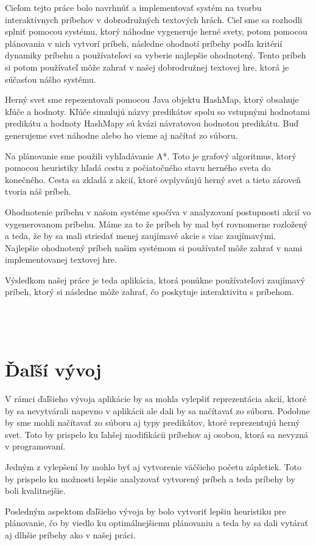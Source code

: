 Cieľom tejto práce bolo navrhnúť a implementovať systém na tvorbu interaktívnych príbehov v dobrodružných textových hrách. Cieľ sme sa rozhodli splniť pomocou systému, ktorý náhodne vygeneruje herné svety, potom pomocou plánovania v nich vytvorí príbeh, následne ohodnotí príbehy podľa kritérií dynamiky príbehu a používateľovi sa vyberie najlepšie ohodnotený. Tento príbeh si potom používateľ môže zahrať v našej dobrodružnej textovej hre, ktorá je súčasťou nášho systému.\par
Herný svet sme repezentovali pomocou Java objektu HashMap, ktorý obsahuje kľúče a hodnoty. Kľúče simulujú názvy predikátov spolu so vstupnými hodnotami predikátu a hodnoty HashMapy sú kvázi návratovou hodnotou predikátu. Buď generujeme svet náhodne alebo ho vieme aj načítať zo súboru.\par
Na plánovanie sme použili vyhľadávanie A*. Toto je grafový algoritmus, ktorý pomocou heuristiky hľadá cestu z počiatočného stavu herného sveta do konečného. Cesta sa zkladá z akcií, ktoré ovplyvňujú herný svet a tieto zároveň tvoria náš príbeh.\par
Ohodnotenie príbehu v našom systéme spočíva v analyzovaní postupnosti akcií vo vygenerovanom príbehu. Máme za to že príbeh by mal byť rovnomerne rozložený a teda, že by sa mali striedať menej zaujímavé akcie s viac zaujímavými. Najlepšie ohodnotený príbeh našim systémom si používateľ môže zahrať v nami implementovanej textovej hre.\par
Výsledkom našej práce je teda aplikácia, ktorá ponúkne používateľovi zaujímavý príbeh, ktorý si následne môže zahrať, čo poskytuje interaktivitu s príbehom. 
\\
\\
\\
\\
\section*{Ďaľší vývoj}
V rámci ďaľšieho vývoja aplikácie by sa mohla vylepšiť reprezentácia akcií, ktoré by sa nevytvárali napevno v aplikácii ale dali by sa načítavať zo súboru. Podobne by sme mohli načítavať zo súboru aj typy predikátov, ktoré reprezentujú herný svet. Toto by prispelo ku ľahšej modifikácii príbehov aj osobou, ktorá sa nevyzná v programovaní.\par
Jedným z vylepšení by mohlo byť aj vytvorenie väčšieho početu zápletiek. Toto by prispelo ku možnosti lepšie analyzovať vytvorený príbeh a teda príbehy by boli kvalitnejšie.\par
Posledným aspektom ďaľšieho vývoja by bolo vytvoriť lepšiu heuristiku pre plánovanie, čo by viedlo ku optimálnejšiemu plánovaniu a teda by sa dali vytárať aj dlhšie príbehy ako v našej práci.

